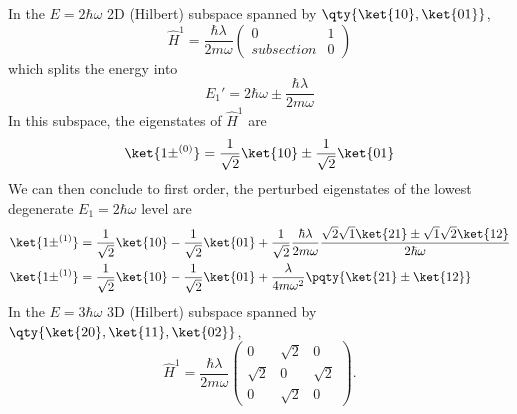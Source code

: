 \documentclass[12pt]{article}
\begin{document}
        In the \(E = 2\hbar\omega\) 2D (Hilbert) subspace spanned by \(\qty{\ket{10} , \ket{01} }\), \[
            \hat{H}^1 = \frac{\hbar\lambda}{2m\omega}\begin{pmatrix} 0&1\\subsection&0 \end{pmatrix} 
        \]
        which splits the energy into \[E_1' =2\hbar\omega \pm \frac{\hbar\lambda}{2m\omega}\]
        In this subspace, the eigenstates of \(\hat{H}^1\) are \[
            \ket{1 \pm  ^{(0)}} = \frac{1}{\sqrt{2}}\ket{10} \pm \frac{1}{\sqrt{2}}\ket{01} 
        \]
        We can then conclude to first order, the perturbed eigenstates of the lowest degenerate \(E_1 = 2\hbar \omega\) level are \begin{align*}
            \ket{{1 \pm  }^{(1)}} &=  \frac{1}{\sqrt{2}}\ket{10} - \frac{1}{\sqrt{2}} \ket{01} + \frac{1}{\sqrt{2} } \frac{ \hbar\lambda}{2m\omega} \frac{\sqrt{2} \sqrt{1} \ket{21} \pm  \sqrt{1} \sqrt{2} \ket{12} }{2\hbar\omega}\\
            \ket{{1 \pm  }^{(1)}} &=  \frac{1}{\sqrt{2}}\ket{10} - \frac{1}{\sqrt{2}} \ket{01} + \frac{ \lambda}{4m\omega^2} \pqty{\ket{21} \pm \ket{12}} 
        \end{align*}
        In the \(E = 3\hbar\omega\) 3D (Hilbert) subspace spanned by \(\qty{\ket{20} , \ket{11}, \ket{02} }\), \[
            \hat{H}^1 = \frac{\hbar\lambda}{2m\omega}\begin{pmatrix} 0&\sqrt{2}&0\\\sqrt{2}&0&\sqrt{2}\\0&\sqrt{2}&0 \end{pmatrix} .
        \]
\end{document}
